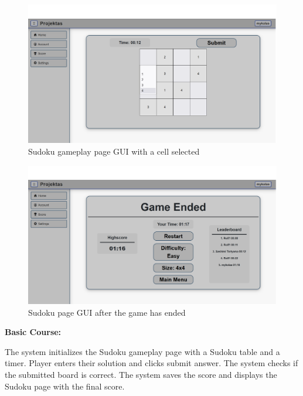 \documentclass[11pt,a4paper]{article}
\newcommand{\heading}[1]{\vspace{1em}\noindent\textbf{#1}\par\vspace{0.5em}}
\begin{document}
\begin{figure}[H]
    \centering
    \includegraphics[width=1\textwidth,keepaspectratio]{PSI_3rd_trial/PNGs/sudoku_4.png}
    \caption{Sudoku gameplay page GUI with a cell selected}
    \label{fig:sudoku_4}
\end{figure}


\begin{figure}[H]
    \centering
    \includegraphics[width=1\textwidth,keepaspectratio]{PSI_3rd_trial/PNGs/sudoku_3.png}
    \caption{Sudoku page GUI after the game has ended}
    \label{fig:sudoku_3}
\end{figure}


\heading{Basic Course:}
The system initializes the Sudoku gameplay page with a Sudoku table and a timer. Player enters their solution and clicks submit answer. The system checks if the submitted board is correct. The system saves the score and displays the Sudoku page with the final score.
\end{document}
